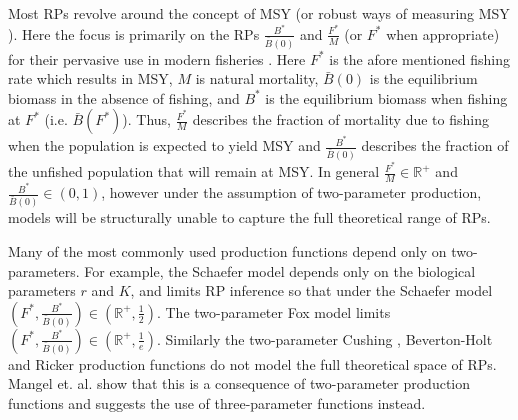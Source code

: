 \documentclass[12pt]{ucscthesis}
\begin{document}
Most RPs revolve around the concept of MSY (or robust ways of measuring MSY \cite{hilborn_pretty_2010,punt_management_2016}).
Here the focus is primarily on the RPs $\frac{B^*}{\bar B(0)}$ and $\frac{F^*}{M}$ (or $F^*$ when appropriate)
for their pervasive use in modern fisheries \cite{punt_extending_2019}. %
%
Here $F^*$ is the afore mentioned fishing rate which results in MSY, $M$ is natural mortality, 
$\bar B(0)$ is the equilibrium biomass in the absence of fishing, and $B^*$ is 
the equilibrium biomass when fishing at $F^*$ (i.e. $\bar B(F^*)$). 
Thus, $\frac{F^*}{M}$ describes the fraction of mortality due to fishing when 
the population is expected to yield MSY and $\frac{B^*}{\bar B(0)}$ describes 
the fraction of the unfished population that will remain at MSY. 
In general $\frac{F^*}{M}\in\mathbb{R}^+$ and \mbox{$\frac{B^*}{\bar B(0)}\in\left(0, 1\right)$,} 
however under the assumption of two-parameter production, %
models will be structurally unable to capture the full theoretical range of RPs.

%
Many of the most commonly used production functions depend only
on two-parameters. For example, the Schaefer model %
depends only on the biological parameters $r$ and $K$, and limits RP inference
so that under the Schaefer model $\left(F^*, \frac{B^*}{\bar B(0)}\right)\in \left(\mathbb{R}^+, \frac{1}{2}\right)$.
The two-parameter Fox model \cite{fox_jr_exponential_1970} limits $\left(F^*, \frac{B^*}{\bar B(0)}\right)\in \left(\mathbb{R}^+, \frac{1}{e}\right)$.
Similarly the two-parameter Cushing \cite{cushing_dependence_1971, cushing_dependence_1973}, Beverton-Holt \cite[BH]{beverton_dynamics_1957}
and Ricker \cite{ricker_stock_1954} production functions do not model the full theoretical space of
RPs. Mangel et. al. \cite{mangel_perspective_2013} show that this is a 
consequence of two-parameter production functions and suggests the use of  
three-parameter functions instead. 
\end{document}

